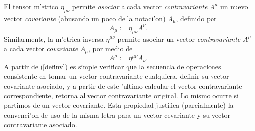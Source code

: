 El tensor m'etrico $\eta_{\mu\nu}$ permite \textit{asociar} a cada vector
\textit{contravariante} $A^\mu$ un nuevo vector \textit{covariante}  (abusando
un poco de la notaci'on) $A_\mu$, definido por
\begin{equation}
A_\mu:=\eta_{\mu\nu}A^\nu.
\end{equation}
Similarmente, la m'etrica inversa $\eta^{\mu\nu}$ permite asociar un vector
\textit{contravariante} $A^\mu$ a cada vector \textit{covariante} $A_\mu$, por
medio de
\begin{equation}
A^\mu:=\eta^{\mu\nu}A_\nu.
\end{equation}
A partir de (\ref{definv}) es simple verificar que la secuencia de operaciones consistente en tomar un vector contravariante cualquiera, definir su vector covariante asociado, y a partir de este 'ultimo calcular el vector contravariante correspondiente, retorna al vector contravariante original. Lo mismo ocurre si partimos de un vector covariante. Esta propiedad justifica (parcialmente) la convenci'on de uso de la misma letra para un vector covariante y su vector contravariante asociado.

